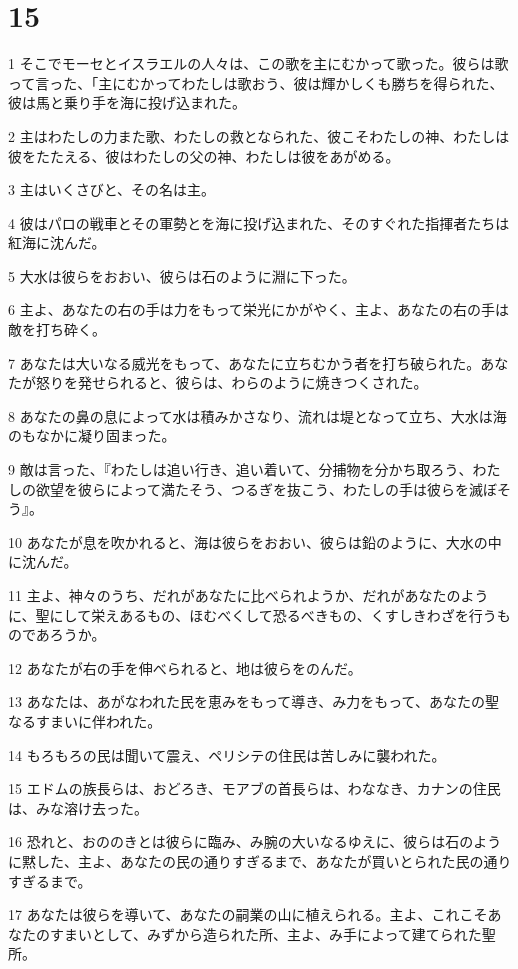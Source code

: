 \chapter{15}

\par 1 そこでモーセとイスラエルの人々は、この歌を主にむかって歌った。彼らは歌って言った、「主にむかってわたしは歌おう、彼は輝かしくも勝ちを得られた、彼は馬と乗り手を海に投げ込まれた。
\par 2 主はわたしの力また歌、わたしの救となられた、彼こそわたしの神、わたしは彼をたたえる、彼はわたしの父の神、わたしは彼をあがめる。
\par 3 主はいくさびと、その名は主。
\par 4 彼はパロの戦車とその軍勢とを海に投げ込まれた、そのすぐれた指揮者たちは紅海に沈んだ。
\par 5 大水は彼らをおおい、彼らは石のように淵に下った。
\par 6 主よ、あなたの右の手は力をもって栄光にかがやく、主よ、あなたの右の手は敵を打ち砕く。
\par 7 あなたは大いなる威光をもって、あなたに立ちむかう者を打ち破られた。あなたが怒りを発せられると、彼らは、わらのように焼きつくされた。
\par 8 あなたの鼻の息によって水は積みかさなり、流れは堤となって立ち、大水は海のもなかに凝り固まった。
\par 9 敵は言った、『わたしは追い行き、追い着いて、分捕物を分かち取ろう、わたしの欲望を彼らによって満たそう、つるぎを抜こう、わたしの手は彼らを滅ぼそう』。
\par 10 あなたが息を吹かれると、海は彼らをおおい、彼らは鉛のように、大水の中に沈んだ。
\par 11 主よ、神々のうち、だれがあなたに比べられようか、だれがあなたのように、聖にして栄えあるもの、ほむべくして恐るべきもの、くすしきわざを行うものであろうか。
\par 12 あなたが右の手を伸べられると、地は彼らをのんだ。
\par 13 あなたは、あがなわれた民を恵みをもって導き、み力をもって、あなたの聖なるすまいに伴われた。
\par 14 もろもろの民は聞いて震え、ペリシテの住民は苦しみに襲われた。
\par 15 エドムの族長らは、おどろき、モアブの首長らは、わななき、カナンの住民は、みな溶け去った。
\par 16 恐れと、おののきとは彼らに臨み、み腕の大いなるゆえに、彼らは石のように黙した、主よ、あなたの民の通りすぎるまで、あなたが買いとられた民の通りすぎるまで。
\par 17 あなたは彼らを導いて、あなたの嗣業の山に植えられる。主よ、これこそあなたのすまいとして、みずから造られた所、主よ、み手によって建てられた聖所。
